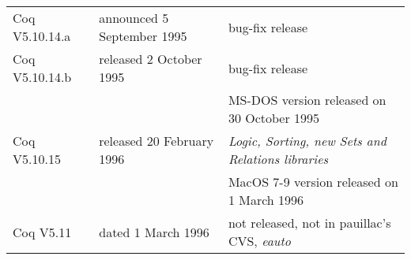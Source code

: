 \documentclass[a4paper]{book}
\newcommand{\feature}[1]{{\em #1}}
\begin{document}
\begin{tabular}{l|l|l}
Coq V5.10.14.a& announced 5 September 1995 & bug-fix release \\ %

Coq V5.10.14.b& released 2 October 1995 & bug-fix release\\
  & & MS-DOS version released on 30 October 1995\\

Coq V5.10.15 & released 20 February 1996 & \feature{Logic, Sorting, new Sets and Relations libraries} \\
  & & MacOS 7-9 version released on 1 March 1996 \\ %

Coq V5.11 & dated 1 March 1996 & not released, not in pauillac's CVS, \feature{eauto} \\
\end{tabular}

\bigskip
\bigskip

\newpage
\end{document}
